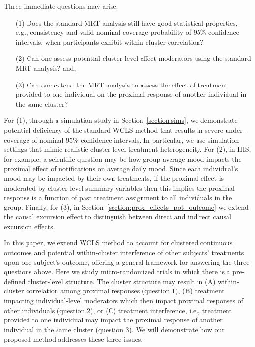 \documentclass[12pt]{article}
\begin{document}
Three immediate questions may arise:
\begin{itemize}
    \item[(1)] Does the standard MRT analysis still have good statistical properties, e.g., consistency and valid nominal coverage probability of $95\%$ confidence intervals, when participants exhibit within-cluster correlation?
    \item[(2)] Can one assess potential cluster-level effect moderators using the standard MRT analysis? and,
    \item[(3)] Can one extend the MRT analysis to assess the effect of treatment provided to one individual on the proximal response of another individual in the same cluster?
\end{itemize}
  For (1), through a simulation study in Section~\ref{section:sims}, we demonstrate potential deficiency of the standard WCLS method that results in severe under-coverage of nominal $95\%$ confidence intervals. In particular, we use simulation settings that mimic realistic cluster-level treatment heterogeneity.  For (2), in IHS, for example, a scientific question may be how group average mood impacts the proximal effect of notifications on average daily mood.  Since each individual's mood may be impacted by their own treatments, if the proximal effect is moderated by cluster-level summary variables then this implies the proximal response is a function of past treatment assignment to all individuals in the group.  Finally, for (3), in Section~\ref{section:prox_effects_pot_outcome} we extend the causal excursion effect to distinguish between direct and indirect causal excursion effects.

In this paper, we extend WCLS method \citep{Boruvkaetal} to  account for clustered continuous outcomes and potential within-cluster interference of other subjects' treatments upon one subject's outcome, offering a general framework for answering the three questions above. Here we study micro-randomized trials in which there is a pre-defined cluster-level structure.  The cluster structure may result in (A) within-cluster correlation among proximal responses (question 1), (B) treatment impacting individual-level moderators which then impact proximal responses of other individuals (question 2), or (C) treatment interference, i.e., treatment provided to one individual may impact the proximal response of another individual in the same cluster (question 3).  We will demonstrate how our proposed method addresses these three issues.
\end{document}

